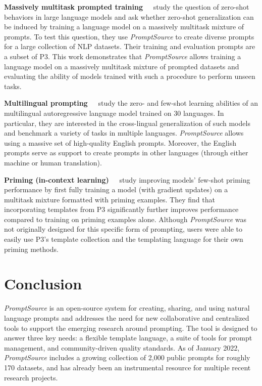 {\bf Massively multitask prompted training~~}
\citet{sanh2021multitask} study the question of zero-shot behaviors in large language models and ask whether zero-shot generalization can be induced by training a language model on a massively multitask mixture of prompts. To test this question, they use \textit{PromptSource} to create diverse prompts for a large collection of NLP datasets. Their training and evaluation prompts are a subset of P3. This work demonstrates that \textit{PromptSource} allows training a language model on a massively multitask mixture of prompted datasets and evaluating the ability of models trained with such a procedure to perform unseen tasks.

 {\bf Multilingual prompting~~}
\citet{lin2021multilingual} study the zero- and few-shot learning abilities of an multilingual autoregressive language model trained on 30 languages. In particular, they are interested in the cross-lingual generalization of such models and benchmark a variety of tasks in multiple languages. \textit{PromptSource} allows using a massive set of high-quality English prompts. Moreover, the English prompts serve as support to create prompts in other languages (through either machine or human translation).

 {\bf Priming (in-context learning)~~}
\citet{metaicl} study improving models' few-shot priming performance by first fully training a model (with gradient updates) on a multitask mixture formatted with priming examples. They find that incorporating templates from P3 significantly further improves performance compared to training on priming examples alone. Although \textit{PromptSource} was not originally designed for this specific form of prompting, users were able to  easily use P3's template collection and the templating language for their own priming methods.

\section{Conclusion}

\textit{PromptSource} is an open-source system for creating, sharing, and using natural language prompts and addresses the need for new collaborative and centralized tools to support the emerging research around prompting. The tool is designed to answer three key needs: a flexible template language, a suite of tools for prompt management, and community-driven quality standards. As of January 2022, \textit{PromptSource} includes a growing collection of 2,000 public prompts for roughly 170 datasets, and has already been an instrumental resource for multiple recent research projects.


